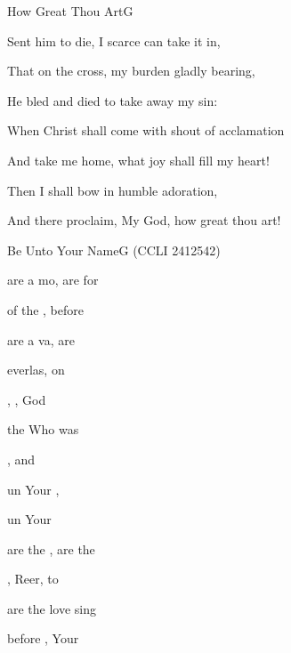 \documentclass[12pt]{book}
\newcommand{\CCLInumber}{2412542}
\newcommand{\CCLIed}{{\CpyRtInfoFont (CCLI \CCLInumber)}}
\begin{document}
\begin{song}{How Great Thou Art}{G}
\begin{SBVerse}
Sent him to die, I scarce can take it in,

That on the cross, my burden gladly bearing,

He bled and died to take away my sin:
\end{SBVerse}

\begin{SBVerse}
When Christ shall come with shout of acclamation

And take me home, what joy shall fill my heart!

Then I shall bow in humble adoration,

And there proclaim, My God, how great thou art!
\end{SBVerse}
\end{song}


\begin{song}{Be Unto Your Name}{G}
    {}
    {}
    {}
    {\CCLIed}

\begin{SBVerse}
 are a mo,  are for 

 of the ,  before 

 are a va,  are 

 everlas,  on  
\end{SBVerse}

\begin{SBChorus}
, ,  God  

  the  Who was  

 ,  and  

 un Your , 

 un Your 
\end{SBChorus}

\begin{SBVerse}
 are the ,  are the  

, Reer,  to  

 are the love   sing  

 before ,  Your  
\end{SBVerse}
\end{song}
\end{document}
